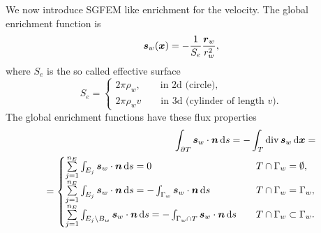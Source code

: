 We now introduce SGFEM like enrichment for the velocity.
The global enrichment function is
\begin{equation}
    \mathbf{\boldsymbol{s}}_w(\mathbf{\boldsymbol{x}}) = -\frac{1}{S_e} \frac{\mathbf{\boldsymbol{r}}_w}{r_w^2} \label{eqn:global_enr_vel},
\end{equation}
where $S_e$ is the so called effective surface
\[
S_e = \begin{cases}2\pi\rho_w, \qquad \textrm{in 2d (circle)}, \\ 2\pi\rho_w v \qquad \textrm{in 3d (cylinder of length }v).\end{cases}
\]
The global enrichment functions have these flux properties
\begin{align}
    \int_{\partial T} \mathbf{\boldsymbol{s}}_w\cdot\mathbf{\boldsymbol{n}} \,{\rm d} s = - \int_T {\rm div}\,\mathbf{\boldsymbol{s}}_w \,{\rm d}\mathbf{\boldsymbol{x}} = \nonumber\\
    = \begin{cases}
        \sum \limits_{j=1}^{n_E} \int_{E_j} \mathbf{\boldsymbol{s}}_w\cdot\mathbf{\boldsymbol{n}} \,{\rm d} s = 0
            & \quad T \cap \Gamma_w=\emptyset, \\
        \sum \limits_{j=1}^{n_E} \int_{E_j} \mathbf{\boldsymbol{s}}_w\cdot\mathbf{\boldsymbol{n}} \,{\rm d} s = 
            - \int_{\Gamma_w} \mathbf{\boldsymbol{s}}_w\cdot\mathbf{\boldsymbol{n}} \,{\rm d} s
            &\quad T \cap \Gamma_w=\Gamma_w, \\
        \sum \limits_{j=1}^{n_E} \int_{E_j\setminus B_w} \mathbf{\boldsymbol{s}}_w\cdot\mathbf{\boldsymbol{n}} \,{\rm d} s 
        = - \int_{\Gamma_w\cap T} \mathbf{\boldsymbol{s}}_w\cdot\mathbf{\boldsymbol{n}} \,{\rm d} s &\quad T \cap \Gamma_w\subset\Gamma_w. \\
    \end{cases}
\end{align}

